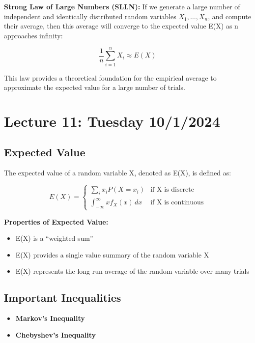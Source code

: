 \documentclass{article}
\begin{document}
    \textbf{Strong Law of Large Numbers (SLLN):} 
    If we generate a large number of independent and identically distributed random variables $X_1, \ldots, X_n$, and compute their average, then this average will converge to the expected value E(X) as n approaches infinity:

    \[
    \frac{1}{n}\sum_{i=1}^{n} X_i \approx E(X)
    \]

    This law provides a theoretical foundation for the empirical average to approximate the expected value for a large number of trials.

    
    \pagebreak

    \section*{Lecture 11: Tuesday 10/1/2024}

    \subsection*{Expected Value}

    The expected value of a random variable X, denoted as E(X), is defined as:

    \[
    E(X) = 
    \begin{cases} 
        \sum_{i} x_i P(X = x_i) & \text{if X is discrete} \\
        \int_{-\infty}^{\infty} x f_X(x) \, dx & \text{if X is continuous}
    \end{cases}
    \]

    \textbf{Properties of Expected Value:}
    \begin{itemize}
        \item E(X) is a ``weighted sum''
        \item E(X) provides a single value summary of the random variable X
        \item E(X) represents the long-run average of the random variable over many trials
    \end{itemize}

    \subsection*{Important Inequalities}

    \begin{itemize}
        \item \textbf{Markov's Inequality}
        \item \textbf{Chebyshev's Inequality}
    \end{itemize}
\end{document}
